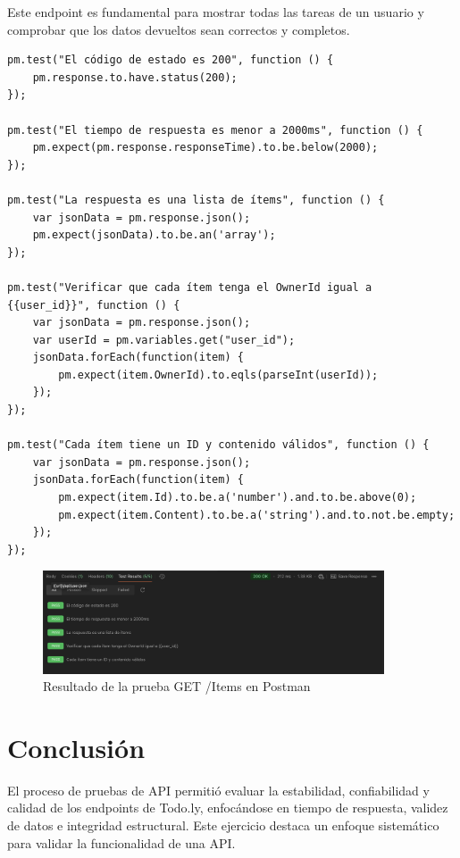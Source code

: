 \documentclass{report}
\begin{document}
Este endpoint es fundamental para mostrar todas las tareas de un usuario y comprobar que los datos devueltos sean correctos y completos.

\begin{lstlisting}
pm.test("El código de estado es 200", function () {
    pm.response.to.have.status(200);
});

pm.test("El tiempo de respuesta es menor a 2000ms", function () {
    pm.expect(pm.response.responseTime).to.be.below(2000);
});

pm.test("La respuesta es una lista de ítems", function () {
    var jsonData = pm.response.json();
    pm.expect(jsonData).to.be.an('array');
});

pm.test("Verificar que cada ítem tenga el OwnerId igual a {{user_id}}", function () {
    var jsonData = pm.response.json();
    var userId = pm.variables.get("user_id");
    jsonData.forEach(function(item) {
        pm.expect(item.OwnerId).to.eqls(parseInt(userId));
    });
});

pm.test("Cada ítem tiene un ID y contenido válidos", function () {
    var jsonData = pm.response.json();
    jsonData.forEach(function(item) {
        pm.expect(item.Id).to.be.a('number').and.to.be.above(0);
        pm.expect(item.Content).to.be.a('string').and.to.not.be.empty;
    });
});
\end{lstlisting}

\begin{figure}[h!]
    \centering
    \includegraphics[width=0.9\textwidth]{./imgs/tc4postman.png}
    \caption{Resultado de la prueba GET /Items en Postman}
    \label{fig:tc2postman}
\end{figure}

\section{Conclusión}
El proceso de pruebas de API permitió evaluar la estabilidad, confiabilidad y calidad de los endpoints de Todo.ly, enfocándose en tiempo de respuesta, validez de datos e integridad estructural. Este ejercicio destaca un enfoque sistemático para validar la funcionalidad de una API.
\end{document}
